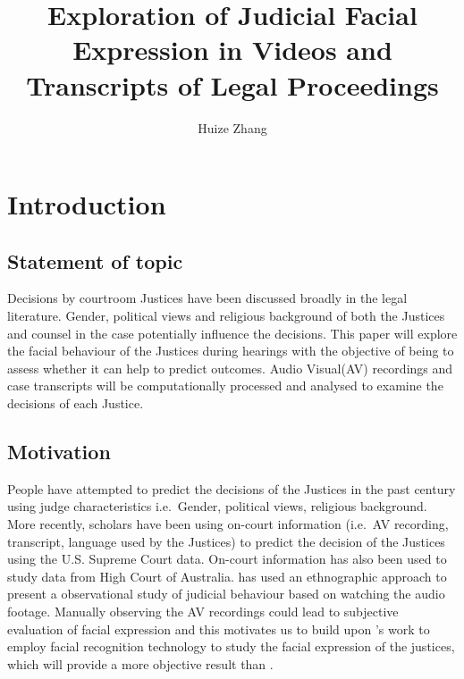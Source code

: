\documentclass{monashthesis}
\author{Huize Zhang}
\title{Exploration of Judicial Facial Expression in Videos and Transcripts of Legal Proceedings}
\begin{document}

\titlepage

{\sf\tighttoc\doublespacing}

\clearpage{}\setcounter{page}{0}

\hypertarget{ch:intro}{%
\chapter{Introduction}\label{ch:intro}}

\hypertarget{statement-of-topic}{%
\section{Statement of topic}\label{statement-of-topic}}

Decisions by courtroom Justices have been discussed broadly in the legal literature. Gender, political views and religious background of both the Justices and counsel in the case potentially influence the decisions. This paper will explore the facial behaviour of the Justices during hearings with the objective of being to assess whether it can help to predict outcomes. Audio Visual(AV) recordings and case transcripts will be computationally processed and analysed to examine the decisions of each Justice.

\hypertarget{motivation}{%
\section{Motivation}\label{motivation}}

People have attempted to predict the decisions of the Justices in the past century using judge characteristics i.e.~Gender, political views, religious background. More recently, scholars\autocites{Shullman2004illusion}{chen2018justice} have been using on-court information (i.e.~AV recording, transcript, language used by the Justices) to predict the decision of the Justices using the U.S. Supreme Court data. On-court information has also been used to study data from High Court of Australia. \textcite{tutton2018judicial} has used an ethnographic approach to present a observational study of judicial behaviour based on watching the audio footage. Manually observing the AV recordings could lead to subjective evaluation of facial expression and this motivates us to build upon \textcite{tutton2018judicial}'s work to employ facial recognition technology to study the facial expression of the justices, which will provide a more objective result than \textcite{tutton2018judicial}.
\end{document}
